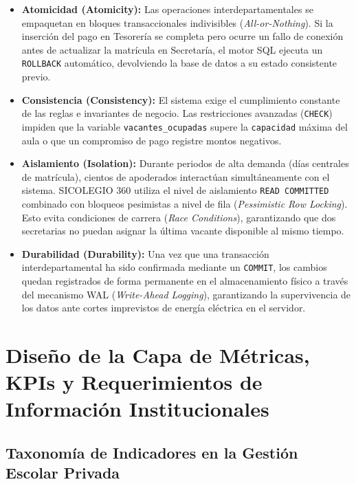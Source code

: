 \documentclass[12pt,a4paper,oneside]{report}
\begin{document}
    \begin{itemize}
        \item \textbf{Atomicidad (Atomicity):} Las operaciones interdepartamentales se empaquetan en bloques transaccionales indivisibles (\textit{All-or-Nothing}). Si la inserción del pago en Tesorería se completa pero ocurre un fallo de conexión antes de actualizar la matrícula en Secretaría, el motor SQL ejecuta un \texttt{ROLLBACK} automático, devolviendo la base de datos a su estado consistente previo.
        \item \textbf{Consistencia (Consistency):} El sistema exige el cumplimiento constante de las reglas e invariantes de negocio. Las restricciones avanzadas (\texttt{CHECK}) impiden que la variable \texttt{vacantes\_ocupadas} supere la \texttt{capacidad} máxima del aula o que un compromiso de pago registre montos negativos.
        \item \textbf{Aislamiento (Isolation):} Durante periodos de alta demanda (días centrales de matrícula), cientos de apoderados interactúan simultáneamente con el sistema. SICOLEGIO 360 utiliza el nivel de aislamiento \texttt{READ COMMITTED} combinado con bloqueos pesimistas a nivel de fila (\textit{Pessimistic Row Locking}). Esto evita condiciones de carrera (\textit{Race Conditions}), garantizando que dos secretarias no puedan asignar la última vacante disponible al mismo tiempo.
        \item \textbf{Durabilidad (Durability):} Una vez que una transacción interdepartamental ha sido confirmada mediante un \texttt{COMMIT}, los cambios quedan registrados de forma permanente en el almacenamiento físico a través del mecanismo WAL (\textit{Write-Ahead Logging}), garantizando la supervivencia de los datos ante cortes imprevistos de energía eléctrica en el servidor.
    \end{itemize}

    \chapter{Diseño de la Capa de Métricas, KPIs y Requerimientos de Información Institucionales}

    \section{Taxonomía de Indicadores en la Gestión Escolar Privada}
\end{document}
